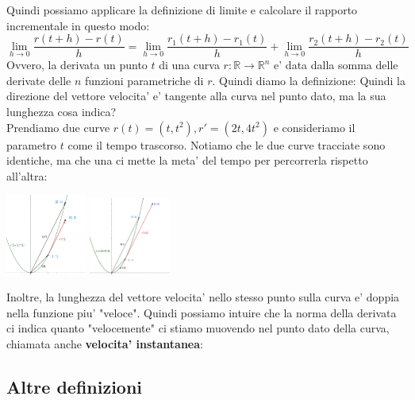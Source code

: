 \documentclass{report}
\begin{document}
Quindi possiamo applicare la definizione di limite e calcolare il rapporto incrementale in questo modo:
\[
  \lim_{h \to 0}\frac{r(t+h)-r(t)}{h} = \lim_{h\to 0}\frac{r_1(t+h)-r_1(t)}{h} + \lim_{h \to 0}\frac{r_2(t+h)-r_2(t)}{h}
\]
Ovvero, la derivata un punto $ t $ di una curva $ r:\mathbb{R}\to\mathbb{R}^n $ e' data dalla somma delle derivate delle $ n $ funzioni parametriche di $ r $. Quindi diamo la definizione:
Quindi la direzione del vettore velocita' e' tangente alla curva nel punto dato, ma la sua lunghezza cosa indica?\\
Prendiamo due curve $ r(t) = (t, t^2),r' = (2t, 4t^2) $ e consideriamo il parametro $ t $ come il tempo trascorso. Notiamo che le due curve tracciate sono identiche, ma che una ci mette la meta' del tempo per percorrerla rispetto all'altra:
\begin{center}
  \includegraphics[width=0.2\textwidth]{img/2024-05-05-17-05-56.png}
  \includegraphics[width=0.2\textwidth]{img/2024-05-05-17-02-33.png}
\end{center}
Inoltre, la lunghezza del vettore velocita' nello stesso punto sulla curva e' doppia nella funzione piu' "veloce". Quindi possiamo intuire che la norma della derivata ci indica quanto "velocemente" ci stiamo muovendo nel punto dato della curva, chiamata anche \textbf{velocita' instantanea}:
\subsection{Altre definizioni}
\end{document}
